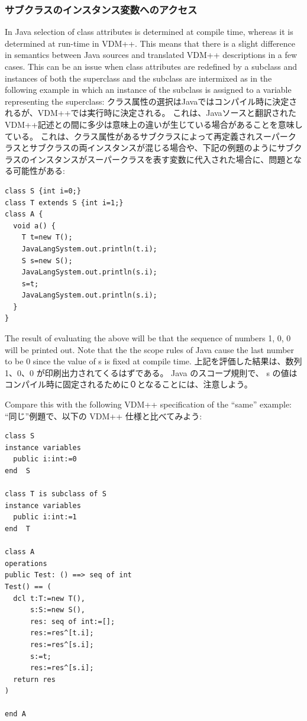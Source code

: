 \documentclass[\pformat,12pt]{jarticle}
\begin{document}
\subsubsection{サブクラスのインスタンス変数へのアクセス}

In Java selection of class attributes is determined at compile time,
whereas it is determined at run-time in VDM++. This means that there
is a slight difference in semantics between Java sources and
translated VDM++ descriptions in a few cases. This can be an issue when
class attributes are redefined by a subclass and instances of both the
superclass and the subclass are intermixed as in the following
example in which an instance of the subclass is assigned to a variable
representing the superclass:
クラス属性の選択はJavaではコンパイル時に決定されるが、VDM++では実行時に決定される。
これは、Javaソースと翻訳された VDM++記述との間に多少は意味上の違いが生じている場合があることを意味している。
これは、クラス属性があるサブクラスによって再定義されスーパークラスとサブクラスの両インスタンスが混じる場合や、下記の例題のようにサブクラスのインスタンスがスーパークラスを表す変数に代入された場合に、問題となる可能性がある:

\begin{small}
\begin{verbatim}
class S {int i=0;}
class T extends S {int i=1;}
class A {
  void a() {
    T t=new T();
    JavaLangSystem.out.println(t.i);  
    S s=new S();
    JavaLangSystem.out.println(s.i);  
    s=t;
    JavaLangSystem.out.println(s.i);  
  }
}
\end{verbatim}
\end{small}

The result of evaluating the above will be that the sequence of
numbers 1, 0, 0 will be printed out. Note that the the scope rules of
Java cause the last number to be 0 since the value of s is fixed at
compile time.
上記を評価した結果は、数列 1、0、0 が印刷出力されてくるはずである。
Java のスコープ規則で、 s の値はコンパイル時に固定されるために０となることには、注意しよう。

Compare this with the following VDM++ specification of the ``same''
example: 
``同じ''例題で、以下の VDM++ 仕様と比べてみよう: 

\begin{small}
\begin{verbatim}
class S
instance variables
  public i:int:=0
end  S

class T is subclass of S
instance variables
  public i:int:=1
end  T

class A
operations
public Test: () ==> seq of int
Test() == (
  dcl t:T:=new T(),
      s:S:=new S(),
      res: seq of int:=[];
      res:=res^[t.i];
      res:=res^[s.i];
      s:=t;
      res:=res^[s.i];
  return res
)

end A
\end{verbatim}
\end{small}
\end{document}
